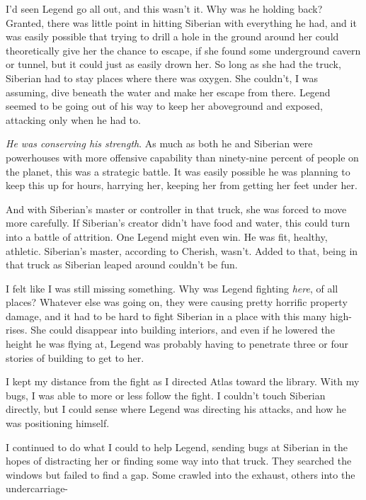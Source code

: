 I'd seen Legend go all out, and this wasn't it.  Why was he holding back?  Granted, there was little point in hitting Siberian with everything he had, and it was easily possible that trying to drill a hole in the ground around her could theoretically give her the chance to escape, if she found some underground cavern or tunnel, but it could just as easily drown her.  So long as she had the truck, Siberian had to stay places where there was oxygen.  She couldn't, I was assuming, dive beneath the water and make her escape from there.  Legend seemed to be going out of his way to keep her aboveground and exposed, attacking only when he had to.



\emph{He was conserving his strength}.  As much as both he and Siberian were powerhouses with more offensive capability than ninety-nine percent of people on the planet, this was a strategic battle.  It was easily possible he was planning to keep this up for hours, harrying her, keeping her from getting her feet under her.



And with Siberian's master or controller in that truck, she was forced to move more carefully.  If Siberian's creator didn't have food and water, this could turn into a battle of attrition.  One Legend might even win.  He was fit, healthy, athletic.  Siberian's master, according to Cherish, wasn't.  Added to that, being in that truck as Siberian leaped around couldn't be fun.



I felt like I was still missing something.  Why was Legend fighting \emph{here}, of all places?  Whatever else was going on, they were causing pretty horrific property damage, and it had to be hard to fight Siberian in a place with this many high-rises.  She could disappear into building interiors, and even if he lowered the height he was flying at, Legend was probably having to penetrate three or four stories of building to get to her.



I kept my distance from the fight as I directed Atlas toward the library.  With my bugs, I was able to more or less follow the fight.  I couldn't touch Siberian directly, but I could sense where Legend was directing his attacks, and how he was positioning himself.



I continued to do what I could to help Legend, sending bugs at Siberian in the hopes of distracting her or finding some way into that truck.  They searched the windows but failed to find a gap.  Some crawled into the exhaust, others into the undercarriage-



